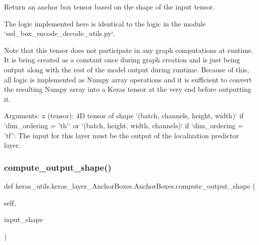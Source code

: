 \begin{DoxyVerb}Return an anchor box tensor based on the shape of the input tensor.

The logic implemented here is identical to the logic in the module `ssd_box_encode_decode_utils.py`.

Note that this tensor does not participate in any graph computations at runtime. It is being created
as a constant once during graph creation and is just being output along with the rest of the model output
during runtime. Because of this, all logic is implemented as Numpy array operations and it is sufficient
to convert the resulting Numpy array into a Keras tensor at the very end before outputting it.

Arguments:
    x (tensor): 4D tensor of shape `(batch, channels, height, width)` if `dim_ordering = 'th'`
or `(batch, height, width, channels)` if `dim_ordering = 'tf'`. The input for this
layer must be the output of the localization predictor layer.
\end{DoxyVerb}
 \mbox{\label{classkeras__utils_1_1keras__layer___anchor_boxes_1_1_anchor_boxes_aac014e7b48a6d681b225db3341ce7198}} 
\subsubsection{\texorpdfstring{compute\+\_\+output\+\_\+shape()}{compute\_output\_shape()}}
{\footnotesize\ttfamily def keras\+\_\+utils.\+keras\+\_\+layer\+\_\+\+Anchor\+Boxes.\+Anchor\+Boxes.\+compute\+\_\+output\+\_\+shape (\begin{DoxyParamCaption}\item[{}]{self,  }\item[{}]{input\+\_\+shape }\end{DoxyParamCaption})}

\mbox{\label{classkeras__utils_1_1keras__layer___anchor_boxes_1_1_anchor_boxes_a1988375ec7920e139beb249a8151bba2}} 

